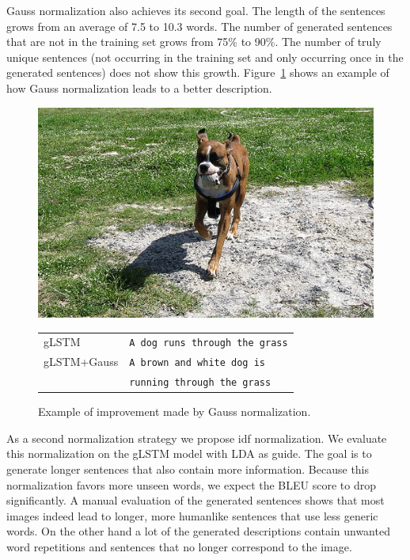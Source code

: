 \documentclass[twoside,twocolumn]{article}
\begin{document}
	Gauss normalization also achieves its second goal. The length of the sentences grows from an average of 7.5 to 10.3 words. The number of generated sentences that are not in the training set grows from 75\% to 90\%. The number of truly unique sentences (not occurring in the training set and only occurring once in the generated sentences) does not show this growth. Figure~\ref{fig:gauss} shows an example of how Gauss normalization leads to a better description.
	
	\begin{figure}
		\centering
		\begin{minipage}[t]{.45\textwidth}
			\centering
			\vspace{0pt}
			\includegraphics[width=\textwidth]{Images/hond}
		\end{minipage}\hfill	
		\begin{minipage}[t]{.7\textwidth}
			\vspace{0pt}
			\begin{tabular}{ll}
				gLSTM & \texttt{A dog runs through the grass} \\
				gLSTM+Gauss & \texttt{A brown and white dog is}\\
				~ & \texttt{running through the grass} \\
			\end{tabular}
		\end{minipage}
		\caption{Example of improvement made by Gauss normalization.}
		\label{fig:gauss}
	\end{figure}
	
	As a second normalization strategy we propose idf normalization. We evaluate this normalization on the gLSTM model with LDA as guide. The goal is to generate longer sentences that also contain more information. Because this normalization favors more unseen words, we expect the BLEU score to drop significantly. A manual evaluation of the generated sentences shows that most images indeed lead to longer, more humanlike sentences that use less generic words. On the other hand a lot of the generated descriptions contain unwanted word repetitions and sentences that no longer correspond to the image.
	
\end{document}
